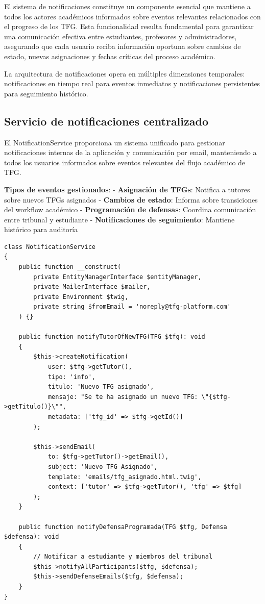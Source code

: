 \documentclass[12pt,a4paper,oneside]{report}
\begin{document}
El sistema de notificaciones constituye un componente esencial que mantiene a todos los actores académicos informados sobre eventos relevantes relacionados con el progreso de los TFG. Esta funcionalidad resulta fundamental para garantizar una comunicación efectiva entre estudiantes, profesores y administradores, asegurando que cada usuario reciba información oportuna sobre cambios de estado, nuevas asignaciones y fechas críticas del proceso académico.

La arquitectura de notificaciones opera en múltiples dimensiones temporales: notificaciones en tiempo real para eventos inmediatos y notificaciones persistentes para seguimiento histórico.
\subsection{Servicio de notificaciones centralizado}\label{notificationservice}

El NotificationService proporciona un sistema unificado para gestionar notificaciones internas de la aplicación y comunicación por email, manteniendo a todos los usuarios informados sobre eventos relevantes del flujo académico de TFG.

\textbf{Tipos de eventos gestionados}:
- \textbf{Asignación de TFGs}: Notifica a tutores sobre nuevos TFGs asignados
- \textbf{Cambios de estado}: Informa sobre transiciones del workflow académico
- \textbf{Programación de defensas}: Coordina comunicación entre tribunal y estudiante
- \textbf{Notificaciones de seguimiento}: Mantiene histórico para auditoría

\begin{lstlisting}
class NotificationService
{
    public function __construct(
        private EntityManagerInterface $entityManager,
        private MailerInterface $mailer,
        private Environment $twig,
        private string $fromEmail = 'noreply@tfg-platform.com'
    ) {}

    public function notifyTutorOfNewTFG(TFG $tfg): void
    {
        $this->createNotification(
            user: $tfg->getTutor(),
            tipo: 'info',
            titulo: 'Nuevo TFG asignado',
            mensaje: "Se te ha asignado un nuevo TFG: \"{$tfg->getTitulo()}\"",
            metadata: ['tfg_id' => $tfg->getId()]
        );

        $this->sendEmail(
            to: $tfg->getTutor()->getEmail(),
            subject: 'Nuevo TFG Asignado',
            template: 'emails/tfg_asignado.html.twig',
            context: ['tutor' => $tfg->getTutor(), 'tfg' => $tfg]
        );
    }

    public function notifyDefensaProgramada(TFG $tfg, Defensa $defensa): void
    {
        // Notificar a estudiante y miembros del tribunal
        $this->notifyAllParticipants($tfg, $defensa);
        $this->sendDefenseEmails($tfg, $defensa);
    }
}
\end{lstlisting}
\end{document}
